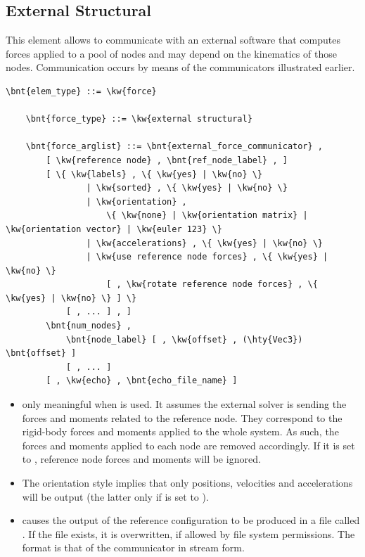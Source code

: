 \subsection{External Structural}
\label{sec:EL:FORCE:EXTERNAL:STRUCTURAL}
This element allows to communicate with an external software that computes
forces applied to a pool of nodes and may depend on the kinematics of those
nodes.
Communication occurs by means of the communicators illustrated earlier.
\begin{Verbatim}[commandchars=\\\{\}]
    \bnt{elem_type} ::= \kw{force}

    \bnt{force_type} ::= \kw{external structural}

    \bnt{force_arglist} ::= \bnt{external_force_communicator} ,
        [ \kw{reference node} , \bnt{ref_node_label} , ]
        [ \{ \kw{labels} , \{ \kw{yes} | \kw{no} \}
                | \kw{sorted} , \{ \kw{yes} | \kw{no} \}
                | \kw{orientation} ,
                    \{ \kw{none} | \kw{orientation matrix} | \kw{orientation vector} | \kw{euler 123} \}
                | \kw{accelerations} , \{ \kw{yes} | \kw{no} \}
                | \kw{use reference node forces} , \{ \kw{yes} | \kw{no} \}
                    [ , \kw{rotate reference node forces} , \{ \kw{yes} | \kw{no} \} ] \}
            [ , ... ] , ]
        \bnt{num_nodes} ,
            \bnt{node_label} [ , \kw{offset} , (\hty{Vec3}) \bnt{offset} ]
            [ , ... ]
        [ , \kw{echo} , \bnt{echo_file_name} ]
\end{Verbatim}
\begin{itemize}
\item {} only meaningful
when  is used.
It assumes the external solver is sending the forces and moments
related to the reference node.
They correspond to the rigid-body forces and moments applied
to the whole system.
As such, the forces and moments applied to each node
are removed accordingly.
If it is set to , reference node forces and moments
will be ignored.

\item The orientation style  implies that only positions, velocities 
and accelerations will be output (the latter only if 
is set to ).

\item {} causes the output of the reference configuration
to be produced in a file called .
If the file exists, it is overwritten, if allowed by file system permissions.
The format is that of the communicator in stream form.
\end{itemize}



